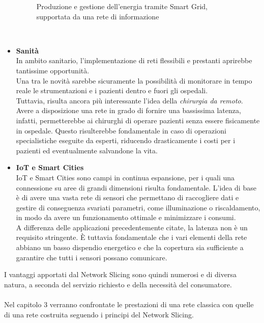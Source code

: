 \begin{itemize}
\begin{figure}
		\caption[Smart Grids]{Produzione e gestione dell'energia tramite Smart Grid, supportata da una rete di informazione}
		\label{fig:07i2ht2hzquybwybh}
	\end{figure}\\
	
	\item \textbf{Sanità}\\
	In ambito sanitario, l'implementazione di reti flessibili e prestanti aprirebbe tantissime opportunità.\\
	Una tra le novità sarebbe sicuramente la possibilità di monitorare in tempo reale le strumentazioni e i pazienti dentro e fuori gli ospedali.\\
	Tuttavia, risulta ancora più interessante l'idea della \textit{chirurgia da remoto}. Avere a disposizione una rete in grado di fornire una bassissima latenza, infatti, permetterebbe ai chirurghi di operare pazienti senza essere fisicamente in ospedale. Questo risulterebbe fondamentale in caso di operazioni specialistiche eseguite da esperti, riducendo drasticamente i costi per i pazienti ed eventualmente salvandone la vita.
	
	\item \textbf{IoT e Smart Cities}\\
	IoT e Smart Cities sono campi in continua espansione, per i quali una connessione su aree di grandi dimensioni risulta fondamentale. L'idea di base è di avere una vasta rete di sensori che permettano di raccogliere dati e gestire di conseguenza svariati parametri, come illuminazione o riscaldamento, in modo da avere un funzionamento ottimale e minimizzare i consumi.\\A differenza delle applicazioni precedentemente citate, la latenza non è un requisito stringente. È tuttavia fondamentale che i vari elementi della rete abbiano un basso dispendio energetico e che la copertura sia sufficiente a garantire che tutti i sensori possano comunicare.  \cite{5g5}\\
	
\end{itemize}I vantaggi apportati dal Network Slicing sono quindi numerosi e di diversa natura, a seconda del servizio richiesto e della necessità del consumatore.\\\\
Nel capitolo 3 verranno confrontate le prestazioni di una rete classica con quelle di una rete costruita seguendo i principi del Network Slicing.